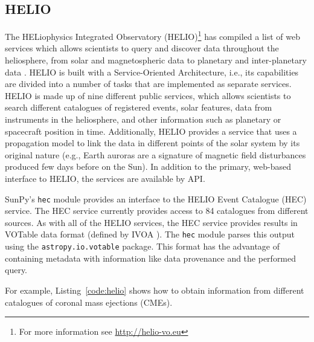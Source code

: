 \subsection{HELIO}\label{ssec:helio}

The HELiophysics Integrated Observatory (HELIO)\footnote{For more information 
see \url{http://helio-vo.eu}} has 
compiled a list of web services which allows scientists to query and 
discover data throughout the heliosphere, from solar and magnetospheric data to planetary and 
inter-planetary data \citep{dps2012}.
HELIO is built with a Service-Oriented Architecture, 
i.e., its capabilities are divided into a number of tasks that are 
implemented as separate services. 
HELIO is made up of nine different public services, 
which allows scientists to search different catalogues of registered events, 
solar features, data from instruments in the heliosphere, and other information 
such as planetary or spacecraft position in time. 
Additionally, HELIO provides a service that uses a 
propagation model to link the data in different points of the solar system by 
its original nature (e.g., Earth auroras are a signature of magnetic 
field disturbances produced few days before on the Sun).
In addition to the primary, web-based interface to 
HELIO, the services are available by API.

SunPy's \texttt{hec} module provides an interface to the
HELIO Event Catalogue (HEC) service. 
The HEC service currently provides access to 84 catalogues from different
sources.
As with all of the HELIO services, the HEC service provides results in VOTable 
data format (defined by IVOA \citep{ochsenbein_ivoa_2011}).
The \texttt{hec} module parses this output using the \texttt{astropy.io.votable} package.
This format has the advantage of containing metadata with information like
data provenance and the performed query.

For example, Listing~\ref{code:helio} shows how to obtain information
from different catalogues of coronal mass ejections (CMEs).

